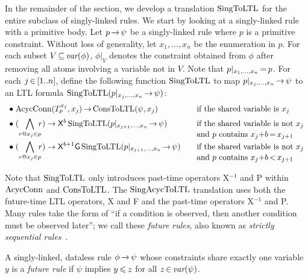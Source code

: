 \smallskip

In the remainder of the section,
we develop a translation $\text{SingToLTL}$ for the entire subclass of singly-linked rules.  
We start by looking at a singly-linked rule with a primitive body.
Let $p\,{\rightarrow}\,\psi$ be a singly-linked rule
where $p$ is a primitive constraint.
Without loss of generality,
let $x_1,...,x_n$ be the enumeration in $p$.
For each subset $V\,{\subseteq}\,\textit{var}(\phi)$,
$\phi|_V$ denotes the constraint obtained from $\phi$
after removing all atoms involving a variable not in $V$.
Note that $p|_{x_1,...,x_n}\,{=}\,p$.
For each $j\,{\in}\,[1..n]$,
define the following function $\text{SingToLTL}$ to map
$p|_{x_j,...,x_n}\,{\rightarrow}\,\psi$ to
an LTL formula
$\text{SingToLTL}(p|_{x_j,...,x_n}\,{\rightarrow}\,\psi)$:
\[
\begin{array}{ll}
\bullet\hspace*{1mm}\AcycConn(T_p^{x_j},x_j) \tight\rightarrow
            \ConstraintToLTL(\psi,x_j) \hfill
&\quad\mbox{if the shared variable is $x_j$}\\*[1.5mm]
\bullet\hspace*{1mm}(\displaystyle{\bigwedge_{r@x_j\in p}}\!\!r)
\rightarrow {\sf X}^b\,\Unroll(p|_{x_{j+1},...,x_n}\tight\rightarrow\psi)
&\quad\mbox{if the shared variable is not $x_j$}\\*[-1em]
&\quad\mbox{and $p$ contains $x_j{+}b\tight=x_{j+1}$}\\*[.5mm]
\bullet\hspace*{1mm}(\displaystyle{\bigwedge_{r@x_j\in p}}\!\!r)
\rightarrow {\sf X}^{b+1}{\sf G}\,\Unroll(p|_{x_{j+1},...,x_n}
\tight\rightarrow\psi)\hfill
&\quad\mbox{if the shared variable is not $x_j$}\\*[-1em]
&\quad\mbox{and $p$ contains $x_j{+}b\tight<x_{j+1}$}
\end{array}
\]

Note that $\text{SingToLTL}$ only introduces
past-time operators {\sf X$^{-1}$} and {\sf P}
within $\text{AcycConn}$ and $\text{ConsToLTL}$.
The $\text{SingAcycToLTL}$ translation
uses both the future-time LTL operators,
{\sf X} and {\sf F}
and
the past-time operators
{\sf X}$^{-1}$ and {\sf P}.
Many rules
take the form of
``if a condition is observed, then another condition must be observed later'';
we call these {\it future rules},
also known as {\it strictly sequential rules}~\cite{zaniolo2012logical}.

\begin{deff}
  A singly-linked, dataless rule $\phi\,{\rightarrow}\,\psi$
  whose constraints share exactly one variable $y$
  is a {\it future rule} if
  $\psi$ implies $y\,{\leqslant}\, z$
  for all $z\,{\in}\,\textit{var}(\psi)$.
\end{deff}


